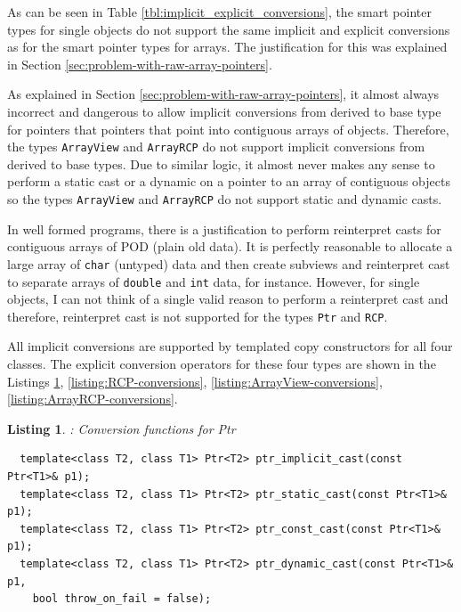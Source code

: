 \documentclass[pdf,ps2pdf,11pt]{SANDreport}
\newtheorem{listing}{Listing}
\begin{document}
As can be seen in Table {}\ref{tbl:implicit_explicit_conversions},
the smart pointer types for single objects do not support the same
implicit and explicit conversions as for the smart pointer types for
arrays.  The justification for this was explained in Section
{}\ref{sec:problem-with-raw-array-pointers}.

As explained in Section {}\ref{sec:problem-with-raw-array-pointers},
it almost always incorrect and dangerous to allow implicit conversions
from derived to base type for pointers that pointers that point into
contiguous arrays of objects.  Therefore, the types
{}\texttt{ArrayView} and {}\texttt{ArrayRCP} do not support implicit
conversions from derived to base types.  Due to similar logic, it
almost never makes any sense to perform a static cast or a dynamic on
a pointer to an array of contiguous objects so the types
{}\texttt{ArrayView} and {}\texttt{ArrayRCP} do not support static and
dynamic casts.

In well formed programs, there is a justification to perform
reinterpret casts for contiguous arrays of POD (plain old data). It is
perfectly reasonable to allocate a large array of {}\texttt{char}
(untyped) data and then create subviews and reinterpret cast to
separate arrays of {}\texttt{double} and {}\texttt{int} data, for
instance.  However, for single objects, I can not think of a single
valid reason to perform a reinterpret cast and therefore, reinterpret
cast is not supported for the types {}\texttt{Ptr} and {}\texttt{RCP}.

All implicit conversions are supported by templated copy constructors
for all four classes.  The explicit conversion operators for these
four types are shown in the Listings {}\ref{listing:Ptr-conversions},
{}\ref{listing:RCP-conversions},
{}\ref{listing:ArrayView-conversions},
{}\ref{listing:ArrayRCP-conversions}.

\begin{listing}: Conversion functions for Ptr\\
\label{listing:Ptr-conversions}
{\small\begin{verbatim}
  template<class T2, class T1> Ptr<T2> ptr_implicit_cast(const Ptr<T1>& p1);
  template<class T2, class T1> Ptr<T2> ptr_static_cast(const Ptr<T1>& p1);
  template<class T2, class T1> Ptr<T2> ptr_const_cast(const Ptr<T1>& p1);
  template<class T2, class T1> Ptr<T2> ptr_dynamic_cast(const Ptr<T1>& p1,
    bool throw_on_fail = false);
\end{verbatim}}
\end{listing}
\end{document}
